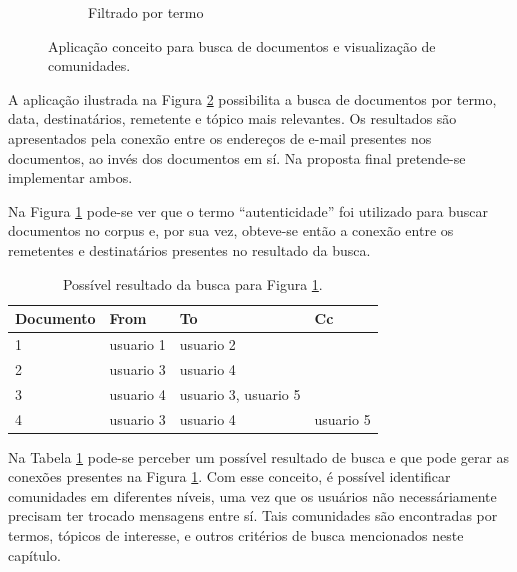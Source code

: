 \documentclass[12pt,a4paper]{article}
\begin{document}
\begin{figure}[H]
\begin{subfigure}[b]{0.48\textwidth}
      \caption{Filtrado por termo}
      \label{fig-search-filtered}
  \end{subfigure}
  \caption{Aplicação conceito para busca de documentos e visualização de comunidades.}
  \label{fig-search-explorer}
\end{figure}



A aplicação ilustrada na Figura \ref{fig-search-explorer} possibilita a busca de documentos por termo, data,
 destinatários, remetente e tópico mais relevantes. Os resultados são apresentados pela conexão entre os
 endereços de e-mail presentes nos documentos, ao invés dos documentos em sí. Na proposta final pretende-se implementar ambos.

Na Figura \ref{fig-search-filtered} pode-se ver que o termo ``autenticidade'' foi utilizado para buscar documentos no corpus e, por sua vez,
 obteve-se então a conexão entre os remetentes e destinatários presentes no resultado da busca.

\begin{table}[H]
  \centering
  \begin{tabular}{llll}
  Documento     & From                       & To                         & Cc         \\
  \hline
  1             & usuario 1                  & usuario 2                  &            \\
  2             & usuario 3                  & usuario 4                  &            \\
  3             & usuario 4                  & usuario 3, usuario 5       &             \\
  4             & usuario 3                  & usuario 4                  & usuario 5             \\
  \hline
  \end{tabular}
  \caption{Possível resultado da busca para Figura \ref{fig-search-filtered}.}
  \label{tab-nich-documents3}
\end{table}

Na Tabela  \ref{tab-nich-documents3} pode-se perceber um possível resultado de busca e que pode gerar as conexões presentes na Figura \ref{fig-search-filtered}.
 Com esse conceito, é possível identificar comunidades em diferentes níveis, uma vez que os usuários não necessáriamente precisam ter trocado mensagens entre sí. Tais 
 comunidades são encontradas por termos, tópicos de interesse, e outros critérios de busca mencionados neste capítulo.
\end{document}
